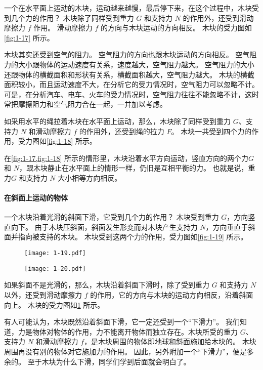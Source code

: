 一个在水平面上运动的木块，运动越来越慢，最后停下来，在这个过程中，木块受到几个力的作用？
木块除了同样受到重力 $G$ 和支持力 $N$ 的作用外，还受到滑动摩擦力 $f$ 作用。
滑动摩擦力 $f$ 的方向与木块运动的方向相反。
木块的受力图如\cref{fig:1-17} 所示。

木块其实还受到空气的阻力。
空气阻力的方向也跟木块运动的方向相反。
空气阻力的大小跟物体的运动速度有关系，速度越大，空气阻力越大。
空气阻力的大小还跟物体的横截面积和形状有关系，横截面积越大，空气阻力越大。
木块的横截面积较小，而且运动速度不大，在分析它的受力情况时，空气阻力可以忽略不计。
可是，在分析汽车、电车、火车的受力情况时，空气阻力往往不能忽略不计，这时常把摩擦阻力和空气阻力合在一起，一并加以考虑。

如采用水平的绳拉着木块在水平面上运动，那么，木块除了同样受到重力 $G$、支持力 $N$ 和滑动摩擦力 $f$ 的作用外，还受到绳的拉力 $F$。
木块一共受到四个力的作用，受力图如\cref{fig:1-18} 所示。

在\cref{fig:1-17,fig:1-18} 所示的情形里，木块沿着水平方向运动，竖直方向的两个力$G$ 和 $N$，跟木块静止在水平面上的情形一样，仍旧是互相平衡的力。
也就是说，重力$G$ 和支持力 $N$ 大小相等方向相反。


\paragraph{在斜面上运动的物体} 
一个木块沿着光滑的斜面下滑，它受到几个力的作用？
木块受到重力 $G$，方向竖直向下。
由于木块压斜面，斜面发生形变而对木块产生支持力 $N$，方向垂直于斜面并指向被支持的木块。
木块受到这两个力的作用，受力图如\cref{fig:1-19} 所示。

\begin{figure}
	\begin{minipage}[b]{0.48\textwidth}
    \centering
		\texttt{[image: 1-19.pdf]}
		\caption{}\label{fig:1-19}
	\end{minipage}
	\begin{minipage}[b]{0.48\textwidth}
		\centering
		\texttt{[image: 1-20.pdf]}
		\caption{}\label{fig:1-20}
	\end{minipage}
\end{figure}

如果斜面不是光滑的，那么，木块沿着斜面下滑时，除了受到重力 $G$ 和支持力 $N$ 以外，还受到滑动摩擦力 $f$ 的作用，它的方向与木块的运动方向相反，沿着斜面向上。
木块的受力图如\cref{fig:1-20} 所示。

有人可能认为，木块既然沿着斜面下滑，它一定还受到一个“下滑力”。
我们知道，力是物体对物体的作用，力不能离开物体而独立存在。木块所受的重力 $G$、支持力 $N$ 和滑动摩擦力 $f$，是木块周围的物体即地球和斜面施加给木块的。
木块周围再没有别的物体对它施加力的作用。
因此，另外附加一个“下滑力”，便是多余的。
至于木块为什么下滑，同学们学到后面就会明白了。

